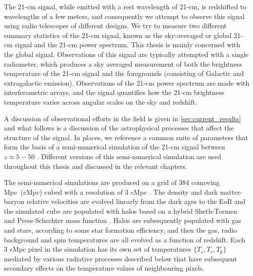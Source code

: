The 21-cm signal, while emitted with a rest wavelength of 21-cm, is redshifted to wavelengths of a few meters, and consequently we attempt to observe this signal using radio telescopes of different designs. We try to measure two different summary statistics of the 21-cm signal, known as the sky-averaged or global 21-cm signal and the 21-cm power spectrum. This thesis is mainly concerned with the global signal. Observations of this signal are typically attempted with a single radiometer, which produces a sky averaged measurement of both the brightness temperature of the 21-cm signal and the foregrounds (consisting of Galactic and extragalactic emission). Observations of the 21-cm power spectrum are made with interferometric arrays, and the signal quantifies how the 21-cm brightness temperature varies across angular scales on the sky and redshift.

A discussion of observational efforts in the field is given in \cref{sec:current_results} and what follows is a discussion of the astrophysical processes that affect the structure of the signal. In places, we reference a common suite of parameters that form the basis of a semi-numerical simulation of the 21-cm signal between $z\approx5 - 50$ \cite{Visbal_2012, Fialkov_rich_2014, Cohen_global_2017, Reis_sta_2021}. Different versions of this semi-numerical simulation are used throughout this thesis and discussed in the relevant chapters.

The semi-numerical simulations are produced on a grid of 384 comoving Mpc~(cMpc) cubed with a resolution of 3 cMpc \cite{Visbal_2012, Fialkov_rich_2014, Cohen_global_2017, Reis_sta_2021}. The density and dark matter-baryon relative velocities are evolved linearly from the dark ages to the EoR and the simulated cube are populated with halos based on a hybrid Sheth-Tormen and Press-Schechter mass function \cite{Barkana2004}. Halos are subsequently populated with gas and stars, according to some star formation efficiency, and then the gas, radio background and spin temperatures are all evolved as a function of redshift. Each 3 cMpc pixel in the simulation has its own set of temperatures $\{T_s, T_r, T_k\}$ mediated by various radiative processes described below that have subsequent secondary effects on the temperature values of neighbouring pixels.

